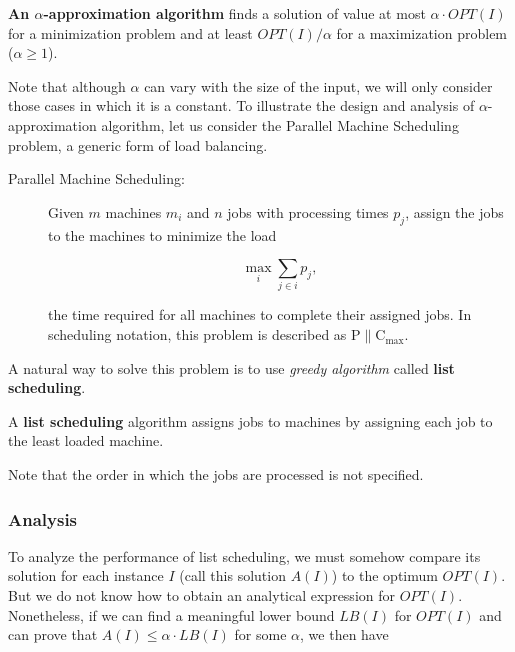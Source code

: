 \documentclass{article}
\begin{document}
\begin{definition}
  \textbf{An $\alpha$-approximation algorithm} finds a solution of value at most $\alpha \cdot
  OPT(I)$ for a minimization problem and at least $OPT(I) / \alpha$ for a maximization problem ($\alpha \ge 1$).
\end{definition}

Note that although $\alpha$ can vary with the size of the input, we will only consider those cases
in which it is a constant. To illustrate the design and analysis of $\alpha$-approximation
algorithm, let us consider the Parallel Machine Scheduling problem, a generic form of load
balancing.

\begin{description}
\item[Parallel Machine Scheduling:]

Given $m$ machines $m_i$ and $n$ jobs with processing times $p_j$, assign the jobs to the machines
to minimize the load

$$
\max\limits_{i} \sum\limits_{j \in i} p_j,
$$

the time required for all machines to complete their assigned jobs. In scheduling notation, this
problem is described as $\mathrm {P \parallel C_{\max}}$.

\end{description}

A natural way to solve this problem is to use \textit{greedy algorithm} called \textbf{list
scheduling}.

\begin{definition}
A \textbf{list scheduling} algorithm assigns jobs to machines by assigning each job to the least
loaded machine.
\end{definition}

Note that the order in which the jobs are processed is not specified.

\subsubsection{Analysis}

To analyze the performance of list scheduling, we must somehow compare its solution for each
instance $I$ (call this solution $A(I)$) to the optimum $OPT(I)$. But we do not know how to obtain
an analytical expression for $OPT(I)$. Nonetheless, if we can find a meaningful lower bound
$LB(I)$ for $OPT(I)$ and can prove that $A(I) \le \alpha \cdot LB(I)$ for some $\alpha$, we then
have
\end{document}
